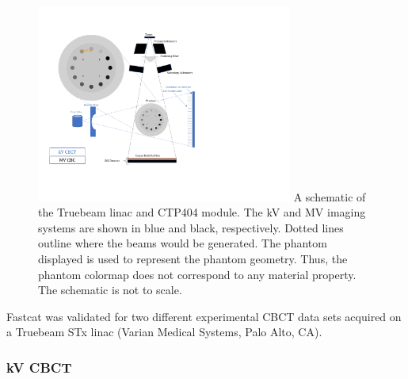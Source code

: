 \begin{figure}[h!]
  \begin{center}
  \includegraphics[width=0.75\textwidth,trim={1cm 4cm 9.5cm 2cm}, clip]{figures/setup_figure.pdf}
  {A schematic of the Truebeam linac and CTP404 module. The kV and MV imaging systems are shown in blue and black, respectively. Dotted lines outline where the beams would be generated. The phantom displayed is used to represent the phantom geometry. Thus, the phantom colormap does not correspond to any material property. The schematic is not to scale. 
  \label{fig_setup} 
    }  %
    \end{center}
\end{figure}


Fastcat was validated for two different experimental CBCT data sets acquired on a Truebeam STx linac (Varian Medical Systems, Palo Alto, CA).

\subsubsection{kV CBCT}

